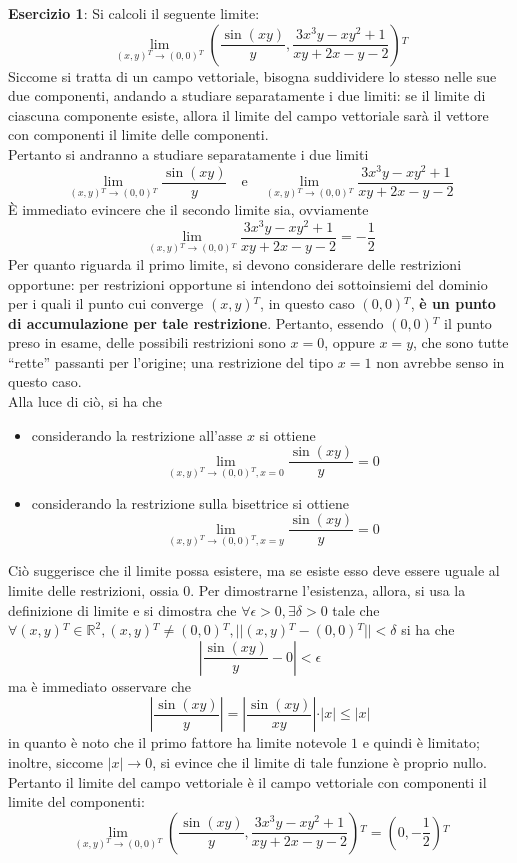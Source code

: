 \documentclass[a4paper]{extarticle}
\newcommand{\quotes}[1]{``#1''}
\begin{document}
\vspace{1em}
\noindent
\textbf{Esercizio 1}: Si calcoli il seguente limite:
\[\lim_{(x,y){^T} \to (0,0){^T}} \left(\frac{\sin(xy)}{y}, \frac{3x^3y-xy^2+1}{xy+2x-y-2}\right){^T}\]
Siccome si tratta di un campo vettoriale, bisogna suddividere lo stesso nelle sue due componenti, andando a studiare separatamente i due limiti: se il limite di ciascuna componente esiste, allora il limite del campo vettoriale sarà il vettore con componenti il limite delle componenti.\\
Pertanto si andranno a studiare separatamente i due limiti
\[\lim_{(x,y){^T} \to (0,0){^T}} \frac{\sin(xy)}{y} \hspace{1em} \text{e} \hspace{1em} \lim_{(x,y){^T} \to (0,0){^T}} \frac{3x^3y-xy^2+1}{xy+2x-y-2}\]
È immediato evincere che il secondo limite sia, ovviamente
\[\lim_{(x,y){^T} \to (0,0){^T}} \frac{3x^3y-xy^2+1}{xy+2x-y-2}=-\frac{1}{2}\]
Per quanto riguarda il primo limite, si devono considerare delle restrizioni opportune: per restrizioni opportune si intendono dei sottoinsiemi del dominio per i quali il punto cui converge $(x,y){^T}$, in questo caso $(0,0){^T}$, \textbf{è un punto di accumulazione per tale restrizione}. Pertanto, essendo $(0,0){^T}$ il punto preso in esame, delle possibili restrizioni sono $x=0$, oppure $x=y$, che sono tutte \quotes{rette} passanti per l'origine; una restrizione del tipo $x=1$ non avrebbe senso in questo caso.\\
Alla luce di ciò, si ha che
\begin{itemize}
    \item considerando la restrizione all'asse $x$ si ottiene
    \[\lim_{(x,y){^T} \to (0,0){^T}, x=0} \frac{\sin(xy)}{y} = 0\]
    \item considerando la restrizione sulla bisettrice si ottiene
    \[\lim_{(x,y){^T} \to (0,0){^T}, x=y} \frac{\sin(xy)}{y} = 0\]
\end{itemize}
Ciò suggerisce che il limite possa esistere, ma se esiste esso deve essere uguale al limite delle restrizioni, ossia $0$. Per dimostrarne l'esistenza, allora, si usa la definizione di limite e si dimostra che $\forall \epsilon > 0, \exists \delta > 0$ tale che $\forall (x,y){^T} \in \mathbb{R}^2, (x,y){^T} \neq (0,0){^T}, \vert \vert (x,y){^T} - (0,0){^T} \vert \vert < \delta$ si ha che
\[\left \vert \frac{\sin(xy)}{y}  - 0 \right \vert < \epsilon\]
ma è immediato osservare che 
\[\left \vert \frac{\sin(xy)}{y} \right \vert = \left \vert \frac{\sin(xy)}{xy} \right \vert \cdot \vert x \vert \leq \vert x \vert\]
in quanto è noto che il primo fattore ha limite notevole $1$ e quindi è limitato; inoltre, siccome $\vert x \vert \to 0$, si evince che il limite di tale funzione è proprio nullo. Pertanto il limite del campo vettoriale è il campo vettoriale con componenti il limite del componenti:
\[\lim_{(x,y){^T} \to (0,0){^T}} \left(\frac{\sin(xy)}{y}, \frac{3x^3y-xy^2+1}{xy+2x-y-2}\right){^T} = \left(0,-\frac{1}{2}\right){^T}\]
\end{document}
